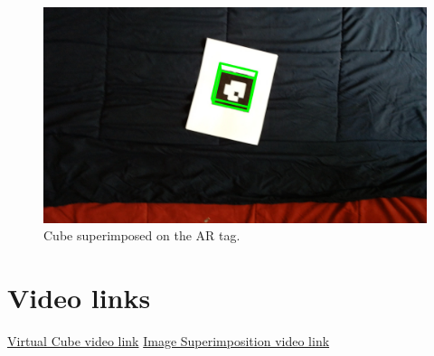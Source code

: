 \documentclass[11pt]{article}
\begin{document}
\begin{description}
\begin{figure}[!htbp]
  \centering
	\includegraphics[width=1\textwidth]{Cube}
	\caption{Cube superimposed on the AR tag.}
\end{figure}
\end{description}

\section{Video links}

\href{https://drive.google.com/file/d/1m5V9MevaSXxdnb2BP1cSaoek3ulr9fvz/view?usp=sharing}{Virtual Cube video link}
\newline
\href{https://drive.google.com/file/d/1y2uU_5usuF46AEnhqDzBH_LwJlQrjp1O/view?usp=sharing}{Image Superimposition video link}
\end{document}
